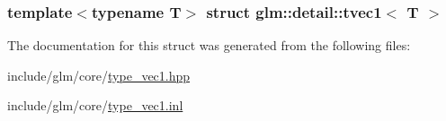 \subsubsection*{template$<$typename \-T$>$ struct glm\-::detail\-::tvec1$<$ T $>$}



\-The documentation for this struct was generated from the following files\-:\begin{DoxyCompactItemize}
\item 
include/glm/core/\hyperlink{type__vec1_8hpp}{type\-\_\-vec1.\-hpp}\item 
include/glm/core/\hyperlink{type__vec1_8inl}{type\-\_\-vec1.\-inl}\end{DoxyCompactItemize}
